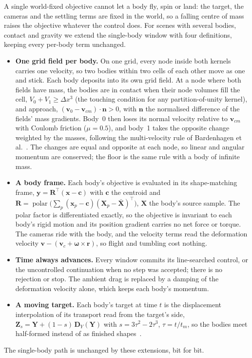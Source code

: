 A single world-fixed objective cannot let a body fly, spin or land: the target, the cameras and the settling terms
are fixed in the world, so a falling centre of mass raises the objective whatever the control does. For scenes with
several bodies, contact and gravity we extend the single-body window with four definitions, keeping every per-body
term unchanged.
\begin{itemize}
  \item \textbf{One grid field per body.} On one grid, every node inside both kernels carries one velocity, so two
        bodies within two cells of each other move as one and stick. Each body deposits into its own grid field. At a
        node where both fields have mass, the bodies are in contact when their node volumes fill the cell,
        $V_0+V_1\ge\Delta x^3$ (the touching condition for any partition-of-unity kernel), and approach,
        $(\mathbf{v}_0-\mathbf{v}_{cm})\cdot\mathbf{n}>0$, with $\mathbf{n}$ the normalised difference of the fields' mass
        gradients. Body~0 then loses its normal velocity relative to $\mathbf{v}_{cm}$ with Coulomb friction ($\mu=0.5$),
        and body~1 takes the opposite change weighted by the masses, following the multi-velocity rule of Bardenhagen
        et al.~\citep{bardenhagen2000granular}. The changes are equal and opposite at each node, so linear and angular
        momentum are conserved; the floor is the same rule with a body of infinite mass.
  \item \textbf{A body frame.} Each body's objective is evaluated in its shape-matching frame, $\mathbf{y}=\mathbf{R}^{\top}
        (\mathbf{x}-\mathbf{c})$ with $\mathbf{c}$ the centroid and $\mathbf{R}=\operatorname{polar}\big(\sum_p(\mathbf{x}_p-\mathbf{c})
        (\mathbf{X}_p-\bar{\mathbf{X}})^{\top}\big)$, $\mathbf{X}$ the body's source sample. The polar factor is
        differentiated exactly, so the objective is invariant to each body's rigid motion and its position gradient
        carries no net force or torque. The cameras ride with the body, and the velocity terms read the deformation
        velocity $\mathbf{v}-(\mathbf{v}_c+\boldsymbol{\omega}\times\mathbf{r})$, so flight and tumbling cost nothing.
  \item \textbf{Time always advances.} Every window commits its line-searched control, or the uncontrolled continuation
        when no step was accepted; there is no rejection or stop. The ambient drag is replaced by a damping of the
        deformation velocity alone, which keeps each body's momentum.
  \item \textbf{A moving target.} Each body's target at time $t$ is the displacement interpolation of its transport
        read from the target's side, $\mathbf{Z}_s=\mathbf{Y}+(1-s)\,\mathbf{D}_Y(\mathbf{Y})$ with $s=3\tau^2-2\tau^3$,
        $\tau=t/t_m$, so the bodies meet half-formed instead of as finished shapes~\citep{mccann1997convexity}.
\end{itemize}
The single-body path is unchanged by these extensions, bit for bit.

